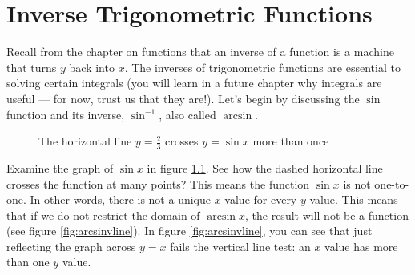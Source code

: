 \chapter{Inverse Trigonometric Functions}

Recall from the chapter on functions that an inverse of a function is a machine that turns $y$ back into $x$. The inverses of trigonometric functions are essential to solving certain integrals (you will learn in a future chapter why integrals are useful --- for now, trust us that they are!). Let's begin by discussing the $\sin$ function and its inverse, $\sin^{-1}$, also called $\arcsin$. 

\begin{figure}
\centering
	\caption{The horizontal line $y=\frac{2}{3}$ crosses $y = \sin{x}$ more than once}
	\label{fig:sinhline}
\end{figure}

Examine the graph of $\sin{x}$ in figure \ref{fig:sinhline}. See how the dashed horizontal line crosses the function at many points? This means the function $\sin{x}$ is not one-to-one. In other words, there is not a unique $x$-value for every $y$-value. This means that if we do not restrict the domain of $\arcsin{x}$, the result will not be a function (see figure \ref{fig:arcsinvline}). In figure \ref{fig:arcsinvline}, you can see that just reflecting the graph across $y=x$ fails the vertical line test: an $x$ value has more than one $y$ value.

